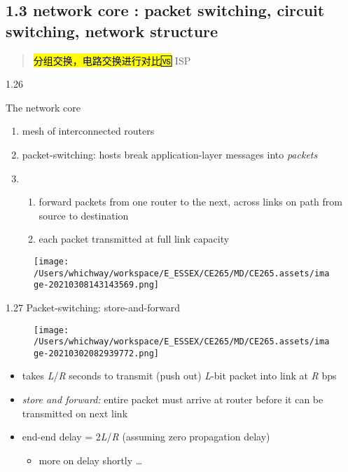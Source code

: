 \documentclass[
]{article}
\begin{document}
\hypertarget{13-network-core--packet-switching-circuit-switching-network-structure}{%
\subsection{1.3 network core : packet switching, circuit switching,
network
structure}\label{13-network-core--packet-switching-circuit-switching-network-structure}}

\begin{quote}
\hl{分组交换，电路交换进行对比🆚} ISP
\end{quote}

1.26

The network core

\begin{enumerate}
\def\labelenumi{\arabic{enumi}.}
\item
  mesh of interconnected routers
\item
  packet-switching: hosts break application-layer messages into
  \emph{packets}
\item
  \begin{enumerate}
  \def\labelenumii{\arabic{enumii}.}
  \item
    forward packets from one router to the next, across links on path
    from source to destination
  \item
    each packet transmitted at full link capacity
  \end{enumerate}
\end{enumerate}

\begin{figure}
\centering
\texttt{[image: /Users/whichway/workspace/E\_ESSEX/CE265/MD/CE265.assets/image-20210308143143569.png]}
\caption{}
\end{figure}

1.27 Packet-switching: store-and-forward

\begin{figure}
\centering
\texttt{[image: /Users/whichway/workspace/E\_ESSEX/CE265/MD/CE265.assets/image-20210302082939772.png]}
\caption{}
\end{figure}

\begin{itemize}
\item
  takes \emph{L}/\emph{R} seconds to transmit (push out) \emph{L}-bit
  packet into link at \emph{R} bps
\item
  \emph{store and forward:} entire packet must arrive at router before
  it can be transmitted on next link
\item
  end-end delay = 2\emph{L}/\emph{R} (assuming zero propagation delay)

  \begin{itemize}
  \item
    more on delay shortly \ldots{}
  \end{itemize}
\end{itemize}
\end{document}

